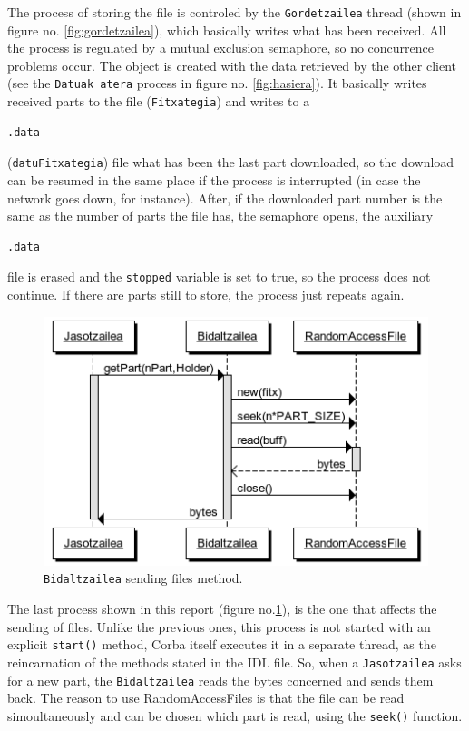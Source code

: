 The process of storing the file is controled by the \texttt{Gordetzailea} thread (shown in figure no. \ref{fig:gordetzailea}), which basically writes what has been received. All the process is regulated by a mutual exclusion semaphore, so no concurrence problems occur. The object is created with the data retrieved by the other client (see the \texttt{Datuak atera} process in figure no. \ref{fig:hasiera}). It basically writes received parts to the file (\texttt{Fitxategia}) and writes to a \begin{verbatim}.data\end{verbatim} (\texttt{datuFitxategia}) file what has been the last part downloaded, so the download can be resumed in the same place if the process is interrupted (in case the network goes down, for instance). After, if the downloaded part number is the same as the number of parts the file has, the semaphore opens, the auxiliary \begin{verbatim}.data\end{verbatim} file is erased and the \texttt{stopped} variable is set to true, so the process does not continue. If there are parts still to store, the process just repeats again.

\begin{figure}
   \centering
   \includegraphics[scale=0.6]{irudiak/bidaltzailerun.png}
   \caption{\texttt{Bidaltzailea} sending files method.}
   \label{fig:bidaltzailea}
\end{figure}  

The last process shown in this report (figure no.\ref{fig:bidaltzailea}), is the one that affects the sending of files. Unlike the previous ones, this process is not started with an explicit \texttt{start()} method, Corba itself executes it in a separate thread, as the reincarnation of the methods stated in the IDL file. So, when a \texttt{Jasotzailea} asks for a new part, the \texttt{Bidaltzailea} reads the bytes concerned and sends them back. The reason to use RandomAccessFiles is that the file can be read simoultaneously and can be chosen which part is read, using the \texttt{seek()} function.

